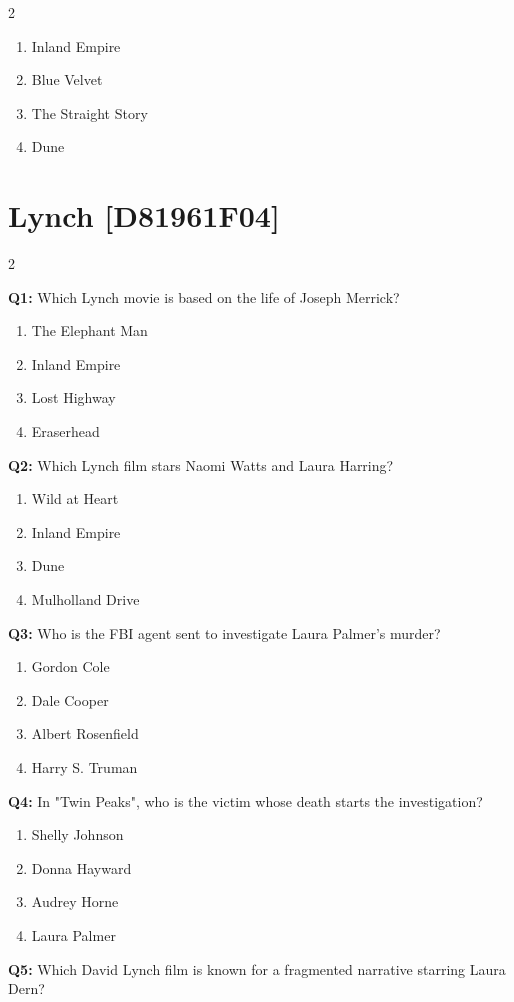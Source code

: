 \documentclass[10pt]{article}
\begin{document}
\begin{multicols}{2}
\begin{enumerate}[label=\arabic*.]
\item Inland Empire
\item Blue Velvet
\item The Straight Story
\item Dune
\end{enumerate}
\end{multicols}

\newpage

\section*{Lynch \footnotesize [D81961F04]}
\begin{multicols}{2}

\textbf{Q1:} Which Lynch movie is based on the life of Joseph Merrick?

\begin{enumerate}[label=\arabic*.]
\item The Elephant Man
\item Inland Empire
\item Lost Highway
\item Eraserhead
\end{enumerate}
\textbf{Q2:} Which Lynch film stars Naomi Watts and Laura Harring?

\begin{enumerate}[label=\arabic*.]
\item Wild at Heart
\item Inland Empire
\item Dune
\item Mulholland Drive
\end{enumerate}
\textbf{Q3:} Who is the FBI agent sent to investigate Laura Palmer's murder?

\begin{enumerate}[label=\arabic*.]
\item Gordon Cole
\item Dale Cooper
\item Albert Rosenfield
\item Harry S. Truman
\end{enumerate}
\textbf{Q4:} In "Twin Peaks", who is the victim whose death starts the investigation?

\begin{enumerate}[label=\arabic*.]
\item Shelly Johnson
\item Donna Hayward
\item Audrey Horne
\item Laura Palmer
\end{enumerate}
\textbf{Q5:} Which David Lynch film is known for a fragmented narrative starring Laura Dern?


\end{multicols}
\end{document}
